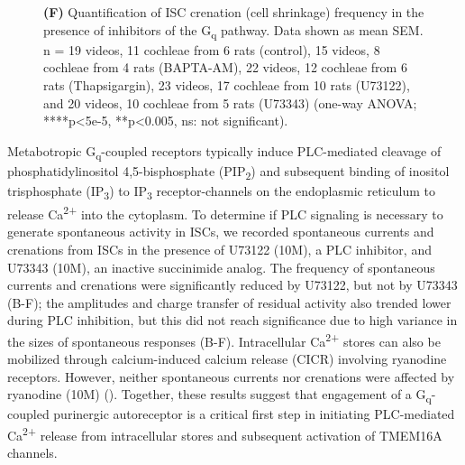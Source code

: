 \documentclass[9pt,lineno]{elife}
\begin{document}
\begin{figure}
{\textbf{(F)} Quantification of ISC crenation (cell shrinkage) frequency in the presence of inhibitors of the G\textsubscript{q} pathway. Data shown as mean \textpm \hspace{0.2 mm} SEM. n = 19 videos, 11 cochleae from 6 rats (control), 15 videos, 8 cochleae from 4 rats (BAPTA-AM), 22 videos, 12 cochleae from 6 rats (Thapsigargin), 23 videos, 17 cochleae from 10 rats (U73122), and 20 videos, 10 cochleae from 5 rats (U73343) (one-way ANOVA; ****p<5e-5, **p<0.005, ns: not significant).
}
\label{fig:f1}
\label{figsupp:sf1p1}
\end{figure}

Metabotropic G\textsubscript{q}-coupled receptors typically induce PLC-mediated cleavage of phosphatidylinositol 4,5-bisphosphate (PIP\textsubscript{2}) and subsequent binding of inositol trisphosphate (IP\textsubscript{3}) to IP\textsubscript{3} receptor-channels on the endoplasmic reticulum to release Ca\textsuperscript{2+} into the cytoplasm. To determine if PLC signaling is necessary to generate spontaneous activity in ISCs, we recorded spontaneous currents and crenations from ISCs in the presence of U73122 (10\textmu M), a PLC inhibitor, and U73343 (10\textmu M), an inactive succinimide analog. The frequency of spontaneous currents and crenations were significantly reduced by U73122, but not by U73343 (B-F); the amplitudes and charge transfer of residual activity also trended lower during PLC inhibition, but this did not reach significance due to high variance in the sizes of spontaneous responses (B-F). Intracellular Ca\textsuperscript{2+} stores can also be mobilized through calcium-induced calcium release (CICR) involving ryanodine receptors. However, neither spontaneous currents nor crenations were affected by ryanodine (10\textmu M) (). Together, these results suggest that engagement of a G\textsubscript{q}-coupled purinergic autoreceptor is a critical first step in initiating PLC-mediated Ca\textsuperscript{2+} release from intracellular stores and subsequent activation of TMEM16A channels.
\end{document}
